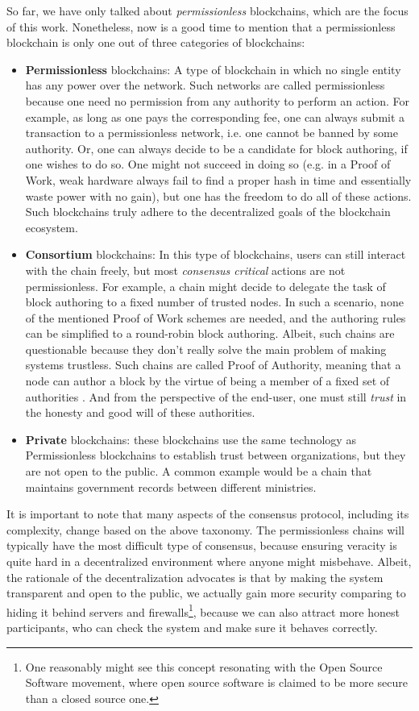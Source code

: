So far, we have only talked about \textit{permissionless} blockchains, which are the focus of this
work. Nonetheless, now is a good time to mention that a permissionless blockchain is only one out of
three categories of blockchains:

\begin{itemize}
	\item \textbf{Permissionless} blockchains: A type of blockchain in which no single entity has
	any power over the network. Such networks are called permissionless because one need no
	permission from any authority to perform an action. For example, as long as one pays the
	corresponding fee, one can always submit a transaction to a permissionless network, i.e. one
	cannot be banned by some authority. Or, one can always decide to be a candidate for block
	authoring, if one wishes to do so. One might not succeed in doing so (e.g. in a Proof of Work,
	weak hardware always fail to find a proper hash in time and essentially waste power with no
	gain), but one has the freedom to do all of these actions. Such blockchains truly adhere to the
	decentralized goals of the blockchain ecosystem.
	\item \textbf{Consortium} blockchains: In this type of blockchains, users can still interact
	with the chain freely, but most \textit{consensus critical} actions are not permissionless. For
	example, a chain might decide to delegate the task of block authoring to a fixed number of
	trusted nodes. In such a scenario, none of the mentioned Proof of Work schemes are needed, and
	the authoring rules can be simplified to a round-robin block authoring. Albeit, such chains are
	questionable because they don't really solve the main problem of making systems trustless. Such
	chains are called Proof of Authority, meaning that a node can author a block by the virtue of
	being a member of a fixed set of authorities \cite{deangelisPBFTVsProofofauthority2018}. And
	from the perspective of the end-user, one must still \textit{trust} in the honesty and good will
	of these authorities.
	\item \textbf{Private} blockchains: these blockchains use the same technology as Permissionless
	blockchains to establish trust between organizations, but they are not open to the public. A
	common example would be a chain that maintains government records between different ministries.
\end{itemize}

It is important to note that many aspects of the consensus protocol, including its complexity,
change based on the above taxonomy. The permissionless chains will typically have the most difficult
type of consensus, because ensuring veracity is quite hard in a decentralized environment where
anyone might misbehave. Albeit, the rationale of the decentralization advocates is that by making
the system transparent and open to the public, we actually gain more security comparing to hiding it
behind servers and firewalls\footnote{One reasonably might see this concept resonating with the Open
Source Software movement, where open source software is claimed to be more secure than a closed
source one.}, because we can also attract more honest participants, who can check the system and
make sure it behaves correctly.

